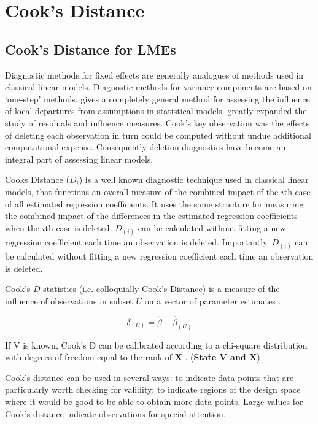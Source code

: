 \documentclass[12pt, a4paper]{report}
\theoremstyle{plain}
\theoremstyle{definition}
\theoremstyle{remark}
\begin{document}



\chapter{Cook's Distance}

		\section{Cook's Distance for LMEs} %

		
Diagnostic methods for fixed effects are generally analogues of methods used in classical linear models.
Diagnostic methods for variance components are based on `one-step' methods. \citet{cook86} gives a completely general method for assessing the influence of local departures from assumptions in statistical models. \citet{cook77} greatly expanded the study of residuals and influence measures. Cook's key observation was the effects of deleting each observation in turn could be computed without undue additional computational expense. Consequently deletion diagnostics have become an integral part of assessing linear models.	


 Cooks Distance ($D_{i}$) is a well known diagnostic technique used in classical linear models, that functions an overall measure of the combined impact of the $i$th case of all estimated regression coefficients. It uses the same structure for measuring the combined impact of the differences in the estimated regression coefficients when the $i$th case is deleted. $D_{(i)}$ can be calculated without fitting a new regression coefficient each time an observation is deleted. Importantly, $D_{(i)}$ can be calculated without fitting a new regression coefficient each time an observation is deleted.
		
 Cook's $D$ statistics (i.e. colloquially Cook's Distance) is a measure of the influence of observations in subset $U$ on a vector of parameter estimates \citep{cook77}.
		
\[ \delta_{(U)} = \hat{\beta} - \hat{\beta}_{(U)}\]
		
If V is known, Cook's D can be calibrated according to a chi-square distribution with degrees of freedom equal to the rank of $\boldsymbol{X}$ \citep{cpj92}. (\textbf{State V and X})
		
		
Cook's distance can be used in several ways: to indicate data points that are particularly worth checking for validity; to indicate regions of the design space where it would be good to be able to obtain more data points. 
Large values for Cook's distance indicate observations for special attention. 
\end{document}
